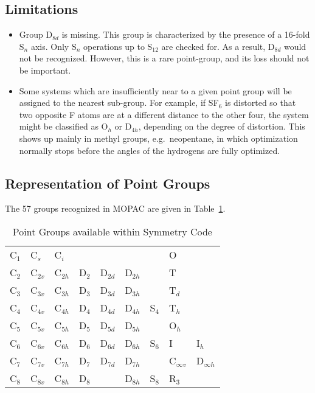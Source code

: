 \subsection*{Limitations}
\begin{itemize}
\item Group D$_{8d}$ is missing.  This group is characterized by the presence
of a 16-fold S$_n$ axis.  Only S$_n$ operations up to S$_{12}$  are  checked
for.  As a  result, D$_{8d}$ would not be recognized.  However, this is a rare
point-group, and its loss should not be important.

\item Some systems which are insufficiently near to a given point group will be
assigned to the nearest sub-group.  For example, if SF$_6$ is distorted so that
two opposite F atoms are at a different distance to the other four, the system
might be classified as O$_h$ or D$_{4h}$, depending on the degree of
distortion.  This shows up mainly in methyl groups, e.g.\ neopentane, in which
optimization normally stops before the angles of the hydrogens are fully
optimized.
\end{itemize}


\subsection{Representation of Point Groups}
The 57 groups recognized in MOPAC are given in Table~\ref{pgs}.
\begin{table}
\caption{\label{pgs} Point Groups available within Symmetry Code}
\begin{center}
\begin{tabular}{lllllllll} \hline
 C$_1$&C$_{s} $ & C$_{i }$   &       &      &      &     &  O             \\
 C$_2$&C$_{2v}$ & C$_{2h}$   & D$_2$ & D$_{2d}$  & D$_{2h}$  &     &  T   \\
 C$_3$&C$_{3v}$ & C$_{3h}$   & D$_3$ & D$_{3d}$  & D$_{3h}$  &     &  T$_d$   \\
 C$_4$&C$_{4v}$ & C$_{4h}$   & D$_4$ & D$_{4d}$  & D$_{4h}$  & S$_4$  &  T$_h$   \\
 C$_5$&C$_{5v}$ & C$_{5h}$   & D$_5$ & D$_{5d}$  & D$_{5h}$  &     &  O$_h$   \\
 C$_6$&C$_{6v}$ & C$_{6h}$   & D$_6$ & D$_{6d}$  & D$_{6h}$  & S$_6$  &  I & I$_h$   \\
 C$_7$&C$_{7v}$ & C$_{7h}$   & D$_7$ & D$_{7d}$  & D$_{7h}$  &  &   C$_{\infty v}$  
& D$_{\infty h}$ \\
 C$_8$&C$_{8v}$ & C$_{8h}$   & D$_8$ &      & D$_{8h}$ & S$_8$  &   R$_3$   \\ \hline
\end{tabular}
\end{center}
\end{table}

